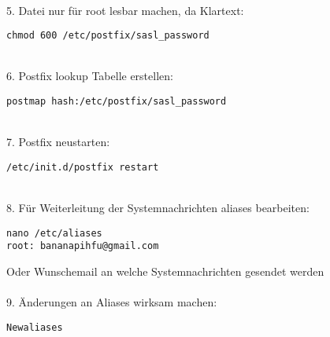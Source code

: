 ~\\
5. Datei nur für root lesbar machen, da Klartext:
\begin{lstlisting}
chmod 600 /etc/postfix/sasl_password 
\end{lstlisting}
~\\
6. Postfix lookup Tabelle erstellen:
\begin{lstlisting}
postmap hash:/etc/postfix/sasl_password
\end{lstlisting}
~\\
7. Postfix neustarten:
\begin{lstlisting}
/etc/init.d/postfix restart
\end{lstlisting}
~\\
8. Für Weiterleitung der Systemnachrichten aliases bearbeiten:
\begin{lstlisting}
nano /etc/aliases 
root: bananapihfu@gmail.com
\end{lstlisting}
Oder Wunschemail an welche Systemnachrichten gesendet werden\\
~\\
9. Änderungen an Aliases wirksam machen:
\begin{lstlisting}
Newaliases
\end{lstlisting}




